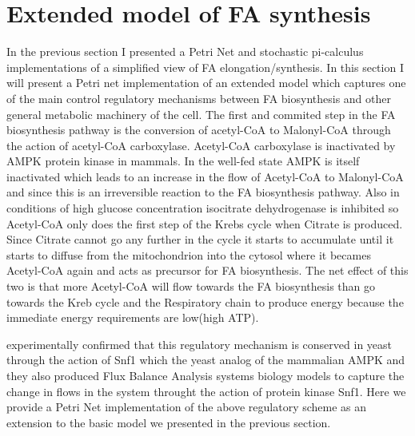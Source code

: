 \section{Extended model of FA synthesis}
In the previous section I presented a Petri Net and stochastic
pi-calculus implementations of a
simplified view of FA elongation/synthesis. In this section I
will present a Petri net implementation of an extended model which
captures one of the main control regulatory mechanisms between FA
biosynthesis and other general metabolic
machinery of the cell. The first and commited step in the FA
biosynthesis pathway is the conversion of acetyl-CoA to Malonyl-CoA
through the action of acetyl-CoA carboxylase. Acetyl-CoA carboxylase
is inactivated by AMPK protein kinase in mammals. In the well-fed
state AMPK is itself inactivated which leads to an increase in the
flow of Acetyl-CoA to Malonyl-CoA and since this is an irreversible
reaction to the FA biosynthesis pathway. 
Also in conditions of high glucose
concentration isocitrate dehydrogenase is inhibited so Acetyl-CoA only
does the first step of the Krebs cycle when Citrate is produced. Since
Citrate cannot go any further in the cycle it starts to accumulate
until it starts to diffuse from the mitochondrion into the cytosol
where it becames Acetyl-CoA again and acts as precursor for FA
biosynthesis. The net effect of this two is that more Acetyl-CoA will
flow towards the FA biosynthesis than go towards the
Kreb cycle and the Respiratory chain to produce energy because the
immediate energy requirements are low(high ATP).

\citet{nielsen2009systems} experimentally confirmed that
this regulatory mechanism is conserved in yeast through the action of
Snf1 which the yeast analog of the mammalian AMPK and they also
produced Flux Balance Analysis systems biology models to capture the
change in flows in the system throught the action of protein kinase
Snf1. Here we provide a Petri Net implementation of the above
regulatory scheme as an extension to the basic model we presented
in the previous section.

